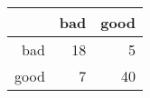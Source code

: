 \begin{table}[ht]
\centering
\begin{tabular}{rrr}
  \hline
 & bad & good \\ 
  \hline
bad &  18 &   5 \\ 
  good &   7 &  40 \\ 
   \hline
\end{tabular}
\end{table}
